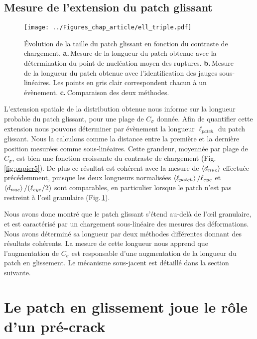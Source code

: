 \subsection{Mesure de l'extension du patch glissant}

\begin{figure}[h!]
\centering
\texttt{[image: ../Figures\_chap\_article/ell\_triple.pdf]}
\caption[Évolution de $\ell_{slip}$ et $d_{nuc}$ en fonction de $C_\sigma$]{Évolution de la taille du patch glissant en fonction du contraste de chargement. \textbf{a.}\,Mesure de la longueur du patch obtenue avec la détermination du point de nucléation moyen des ruptures. \textbf{b.}\,Mesure de la longueur du patch obtenue avec l'identification des jauges sous-linéaires. Les points en gris clair correspondent chacun à un évènement. \textbf{c.}\,Comparaison des deux méthodes.}
\label{fig:ell_triple}
\end{figure}

L'extension spatiale de la distribution obtenue nous informe sur la longueur probable du patch glissant, pour une plage de $C_\sigma$ donnée. Afin de quantifier cette extension nous pouvons déterminer par évènement la longueur $\ell_{patch}$ du patch glissant. Nous la calculons comme la distance entre la première et la dernière position mesurées comme sous-linéaires.  Cette grandeur, moyennée par plage de $C_\sigma$, est bien une fonction croissante du contraste de chargement (Fig.\,\ref{fig:papier5}).
De plus ce résultat est cohérent avec la mesure de $\left\langle {d_{nuc}} \right\rangle$ effectuée précédemment, puisque les deux longueurs normalisées $\left\langle {\ell_{patch}} \right\rangle/\ell_{eye}$ et $\left\langle {d_{nuc}} \right\rangle/(\ell_{eye}/2)$ sont comparables, en particulier lorsque le patch n'est pas restreint à l'œil granulaire (Fig.\,\ref{fig:ell_triple}).


Nous avons donc montré que le patch glissant s'étend au-delà de l'œil granulaire, et est caractérisé par un chargement sous-linéaire des mesures des déformations. Nous avons déterminé sa longueur par deux méthodes différentes donnant des résultats cohérents. La mesure de cette longueur nous apprend que l'augmentation de $C_\sigma$ est responsable d'une augmentation de la longueur du patch en glissement. Le mécanisme sous-jacent est détaillé dans la section suivante.

\newpage

\section{Le patch en glissement joue le rôle d'un pré-crack}

